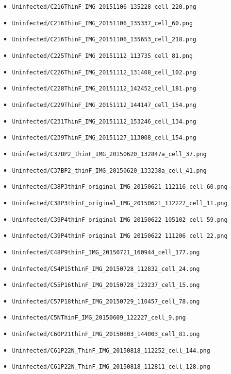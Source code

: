 \begin{itemize}
\item \texttt{Uninfected/C216ThinF\_IMG\_20151106\_135228\_cell\_220.png}
\item \texttt{Uninfected/C216ThinF\_IMG\_20151106\_135337\_cell\_60.png}
\item \texttt{Uninfected/C216ThinF\_IMG\_20151106\_135653\_cell\_218.png}
\item \texttt{Uninfected/C225ThinF\_IMG\_20151112\_113735\_cell\_81.png}
\item \texttt{Uninfected/C226ThinF\_IMG\_20151112\_131408\_cell\_102.png}
\item \texttt{Uninfected/C228ThinF\_IMG\_20151112\_142452\_cell\_181.png}
\item \texttt{Uninfected/C229ThinF\_IMG\_20151112\_144147\_cell\_154.png}
\item \texttt{Uninfected/C231ThinF\_IMG\_20151112\_153246\_cell\_134.png}
\item \texttt{Uninfected/C239ThinF\_IMG\_20151127\_113008\_cell\_154.png}
\item \texttt{Uninfected/C37BP2\_thinF\_IMG\_20150620\_132847a\_cell\_37.png}
\item \texttt{Uninfected/C37BP2\_thinF\_IMG\_20150620\_133238a\_cell\_41.png}
\item \texttt{Uninfected/C38P3thinF\_original\_IMG\_20150621\_112116\_cell\_60.png}
\item \texttt{Uninfected/C38P3thinF\_original\_IMG\_20150621\_112227\_cell\_11.png}
\item \texttt{Uninfected/C39P4thinF\_original\_IMG\_20150622\_105102\_cell\_59.png}
\item \texttt{Uninfected/C39P4thinF\_original\_IMG\_20150622\_111206\_cell\_22.png}
\item \texttt{Uninfected/C48P9thinF\_IMG\_20150721\_160944\_cell\_177.png}
\item \texttt{Uninfected/C54P15thinF\_IMG\_20150728\_112832\_cell\_24.png}
\item \texttt{Uninfected/C55P16thinF\_IMG\_20150728\_123237\_cell\_15.png}
\item \texttt{Uninfected/C57P18thinF\_IMG\_20150729\_110457\_cell\_78.png}
\item \texttt{Uninfected/C5NThinF\_IMG\_20150609\_122227\_cell\_9.png}
\item \texttt{Uninfected/C60P21thinF\_IMG\_20150803\_144003\_cell\_81.png}
\item \texttt{Uninfected/C61P22N\_ThinF\_IMG\_20150818\_112252\_cell\_144.png}
\item \texttt{Uninfected/C61P22N\_ThinF\_IMG\_20150818\_112811\_cell\_128.png}

\end{itemize}
